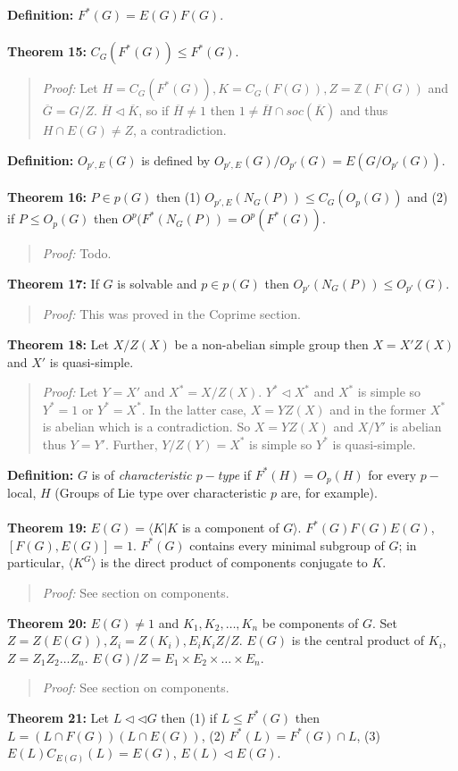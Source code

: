 {\bf Definition:} $F^*(G)= E(G)F(G)$.
\\
\\
{\bf Theorem 15:} $C_G(F^*(G)) \le F^*(G)$.
\begin{quote}
\emph{Proof:}
Let $H=C_G(F^*(G)), K= C_G(F(G)), Z= {\mathbb Z}(F(G))$ and ${\overline G}= G/Z$.
${\overline H} \lhd {\overline K}$, so if ${\overline H} \ne 1$ then
$1 \ne {\overline H} \cap soc({\overline K})$ and thus $H \cap E(G) \ne Z$,
a contradiction.
\end{quote}
{\bf Definition:} $O_{p', E}(G)$ is defined by
$O_{p', E}(G)/O_{p'}(G)= E(G/O_{p'}(G))$.
\\
\\
{\bf Theorem 16:} $P \in p(G)$ then (1) $O_{p', E}(N_G(P)) \le C_G(O_p(G))$ and
(2) if $P \le O_p(G)$ then $O^p(F^*(N_G(P))= O^p(F^*(G))$.
\begin{quote}
\emph{Proof:}
Todo.
\end{quote}
{\bf Theorem 17:} If $G$ is solvable and $p \in p(G)$ then $O_{p'}(N_G(P)) \le O_{p'}(G)$.
\begin{quote}
\emph{Proof:} This was proved in the Coprime section.
\end{quote}
{\bf Theorem 18:}
Let $X/Z(X)$ be a non-abelian simple group then $X=X'Z(X)$ and $X'$ is
quasi-simple.
\begin{quote}
\emph{Proof:}
Let $Y=X'$ and $X^*= X/Z(X)$.  $Y^* \lhd X^*$ and $X^*$ is simple so $Y^*=1$ or
$Y^*=X^*$.  In the latter case, $X=YZ(X)$ and in the former $X^*$ is abelian which is a contradiction.
So $X=Y Z(X)$ and $X/Y'$ is abelian thus $Y=Y'$.  Further, $Y/Z(Y)= X^*$ is simple so $Y^*$ is quasi-simple.
\end{quote}
{\bf Definition:} $G$ is of \emph{ characteristic $p-$type}
if  $F^*(H)=O_p(H)$ for every $p-$local, $H$ (Groups of Lie type over characteristic
$p$ are, for example).
\\
\\
{\bf Theorem 19:} $E(G)= \langle K | K$ is a component of $G \rangle $.  $F^*(G) F(G)E(G)$, $[F(G), E(G)]=1$.
$F^*(G)$ contains every minimal subgroup of $G$; in particular, $ \langle K^G \rangle $ is the
direct product of components conjugate to $K$.
\begin{quote}
\emph{Proof:}
See section on components.
\end{quote}
{\bf Theorem 20:} $E(G) \ne 1$ and $K_1 , K_2 , \ldots , K_n$ be components of $G$. Set
$Z=Z(E(G)), Z_i= Z(K_i), E_i K_i Z /Z$.  $E(G)$ is the central product of $K_i$,
$Z= Z_1 Z_2 \ldots Z_n$.  $E(G)/Z= E_1 \times E_2 \times \ldots \times E_n$.
\begin{quote}
\emph{Proof:}
See section on components.
\end{quote}
{\bf Theorem 21:}  Let $L \lhd \lhd G$ then (1) if $L \le F^*(G)$ then $L= (L \cap F(G)) (L \cap E(G))$,
(2) $F^*(L) = F^*(G) \cap L$,
(3) $E(L) C_{E(G)}(L) =E(G)$, $E(L) \lhd E(G)$.
